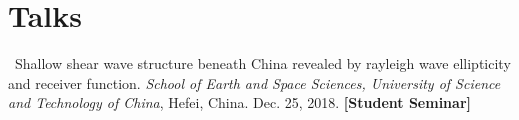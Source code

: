 \section*{Talks}
\begin{etaremune}
\item
    \Xiao\
    Shallow shear wave structure beneath China revealed by rayleigh wave ellipticity and receiver function.
    \textit{School of Earth and Space Sciences, University of Science and Technology of China}, Hefei, China.
    Dec. 25, 2018.
    \textbf{[Student Seminar]}
\end{etaremune}
